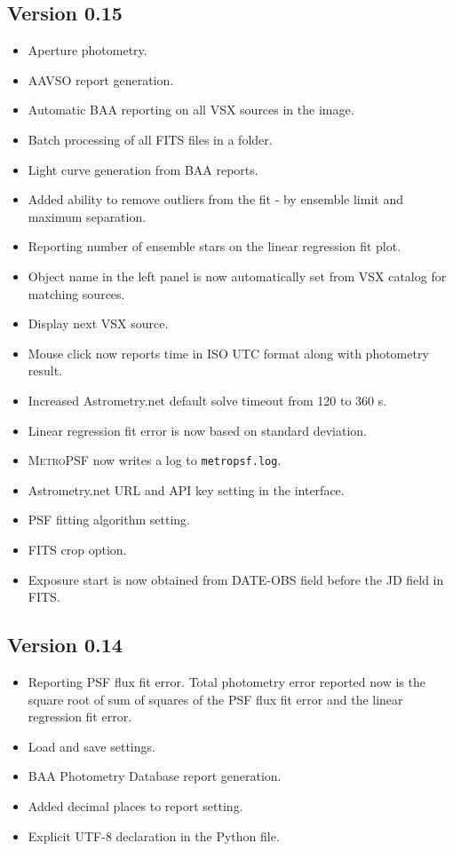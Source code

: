 \documentclass{article}
\begin{document}
\subsection{Version 0.15}
\begin{itemize}
\item Aperture photometry.
\item AAVSO report generation.
\item Automatic BAA reporting on all VSX sources in the image.
\item Batch processing of all FITS files in a folder.
\item Light curve generation from BAA reports.
\item Added ability to remove outliers from the fit - by ensemble limit and maximum separation. 
\item Reporting number of ensemble stars on the linear regression fit plot.
\item Object name in the left panel is now automatically set from VSX catalog for matching sources.
\item Display next VSX source.
\item Mouse click now reports time in ISO UTC format along with photometry result.
\item Increased Astrometry.net default solve timeout from 120 to 360 s.
\item Linear regression fit error is now based on standard deviation.
\item \textsc{MetroPSF} now writes a log to \texttt{metropsf.log}.
\item Astrometry.net URL and API key setting in the interface.
\item PSF fitting algorithm setting.
\item FITS crop option.
\item Exposure start is now obtained from DATE-OBS field before the JD field in FITS.
\end{itemize}


\subsection{Version 0.14}
\begin{itemize}
\item Reporting PSF flux fit error. Total photometry error reported now is the square root of sum of squares of the PSF flux fit error and the linear regression fit error. 
\item Load and save settings.
\item BAA Photometry Database report generation.
\item Added decimal places to report setting.
\item Explicit UTF-8 declaration in the Python file. 
\end{itemize}
\end{document}
